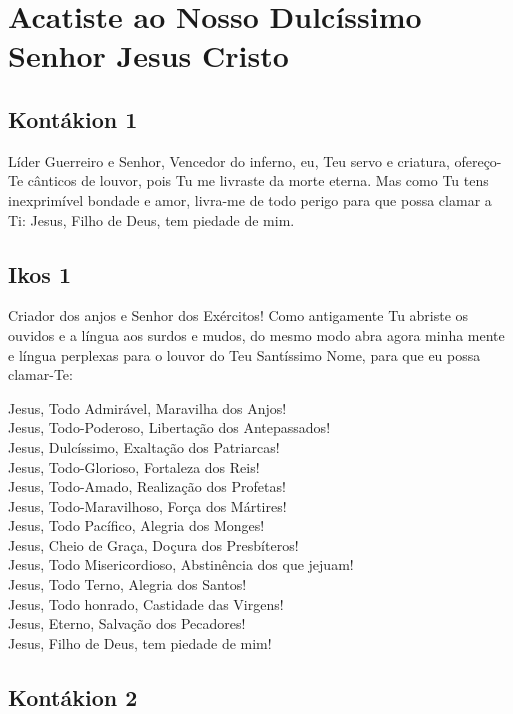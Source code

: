 \documentclass{subfiles}
\begin{document}
\cleardoubleevenpage{}
\pagestyle{empty}

\chapter{Acatiste ao Nosso Dulcíssimo Senhor Jesus Cristo}
\pagestyle{headings}

\section*{Kontákion 1}

Líder Guerreiro e Senhor, Vencedor do inferno, eu, Teu servo e
criatura, ofereço-Te cânticos de louvor, pois Tu me livraste da morte eterna.
Mas como Tu tens inexprimível bondade e amor, livra-me de todo perigo para
que possa clamar a Ti: Jesus, Filho de Deus, tem piedade de mim.

\section*{Ikos 1}

Criador dos anjos e Senhor dos Exércitos! Como antigamente Tu
abriste os ouvidos e a língua aos surdos e mudos, do mesmo modo abra agora
minha mente e língua perplexas para o louvor do Teu Santíssimo Nome, para
que eu possa clamar-Te:

Jesus, Todo Admirável, Maravilha dos Anjos! \\
Jesus, Todo-Poderoso, Libertação dos Antepassados! \\
Jesus, Dulcíssimo, Exaltação dos Patriarcas! \\
Jesus, Todo-Glorioso, Fortaleza dos Reis! \\
Jesus, Todo-Amado, Realização dos Profetas! \\
Jesus, Todo-Maravilhoso, Força dos Mártires! \\
Jesus, Todo Pacífico, Alegria dos Monges! \\
Jesus, Cheio de Graça, Doçura dos Presbíteros! \\
Jesus, Todo Misericordioso, Abstinência dos que jejuam! \\
Jesus, Todo Terno, Alegria dos Santos! \\
Jesus, Todo honrado, Castidade das Virgens! \\
Jesus, Eterno, Salvação dos Pecadores! \\
Jesus, Filho de Deus, tem piedade de mim!

\section*{Kontákion 2}
\end{document}
